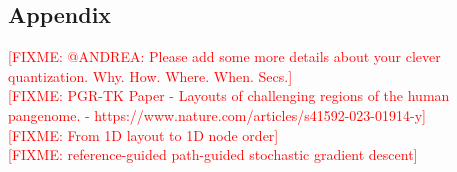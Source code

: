 \documentclass{bioinfo}
\theoremstyle{definition}
\newcommand{\red}[1]{{\textcolor{Red}{#1}}}
\newcommand{\FIXME}[1]{\red{[FIXME: #1]}}
\begin{document}
	
	
	
	
	\begin{appendices}
	    \section{Appendix}
	    \FIXME{@ANDREA: Please add some more details about your clever quantization. Why. How. Where. When. Secs.} \\
	    \FIXME{PGR-TK Paper - Layouts of challenging regions of the human pangenome. - https://www.nature.com/articles/s41592-023-01914-y} \\
	    \FIXME{From 1D layout to 1D node order} \\
	    \FIXME{reference-guided path-guided stochastic gradient descent}
	\end{appendices}
\end{document}
